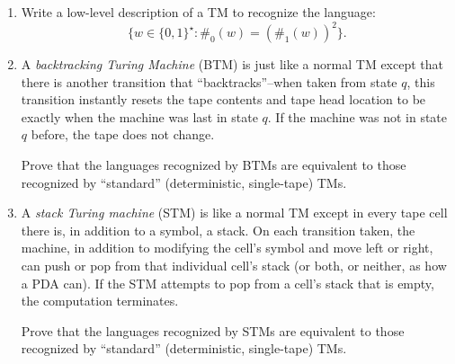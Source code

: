 \begin{enumerate}[resume]
\item {} Write a low-level description of a TM to recognize the language:
\[
\{w \in \{0, 1\}^\star : \#_0(w) = (\#_1(w))^2 \}.
\]

\item {} A \emph{backtracking Turing Machine} (BTM) is just like a normal TM except that there is another transition that ``backtracks''--when taken from state $q$, this transition instantly resets the tape contents and tape head location to be exactly when the machine was last in state $q$. If the machine was not in state $q$ before, the tape does not change.

Prove that the languages recognized by BTMs are equivalent to those recognized by ``standard'' (deterministic, single-tape) TMs.

\item {} A \emph{stack Turing machine} (STM) is like a normal TM except in every tape cell there is, in addition to a symbol, a stack. On each transition taken, the machine, in addition to modifying the cell's symbol and move left or right, can push or pop from that individual cell's stack (or both, or neither, as how a PDA can). If the STM attempts to pop from a cell's stack that is empty, the computation terminates.

Prove that the languages recognized by STMs are equivalent to those recognized by ``standard'' (deterministic, single-tape) TMs.

\end{enumerate}